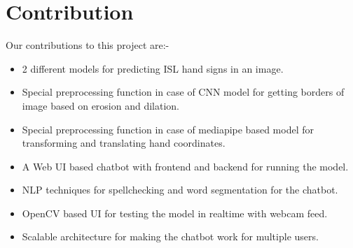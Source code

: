 \documentclass[12pt,a4paper]{report}
\begin{document}
\section{Contribution}
Our contributions to this project are:-
\begin{itemize}
	\item 2 different models for predicting ISL hand signs in an image.
	\item Special preprocessing function in case of CNN model for getting borders of image based on erosion and dilation.
	\item Special preprocessing function in case of mediapipe based model for transforming and translating hand coordinates.
	\item A Web UI based chatbot with frontend and backend for running the model.
	\item NLP techniques for spellchecking and word segmentation for the chatbot.
	\item OpenCV based UI for testing the model in realtime with webcam feed.
	\item Scalable architecture for making the chatbot work for multiple users.
\end{itemize}
\end{document}
